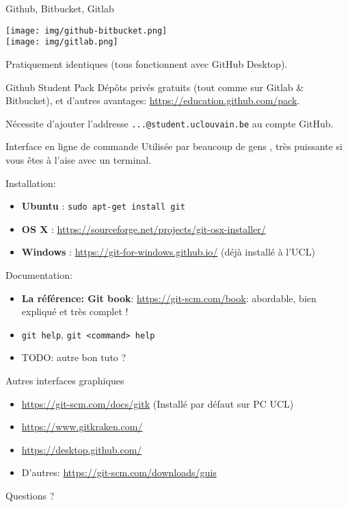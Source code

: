 \documentclass{beamer}
\begin{document}
\begin{frame}{Github, Bitbucket, Gitlab}
    \begin{center}
        \texttt{[image: img/github-bitbucket.png]} \\
        \texttt{[image: img/gitlab.png]}
    \end{center}
    Pratiquement identiques (tous fonctionnent avec GitHub Desktop).
\end{frame}

\begin{frame}{Github Student Pack}
    Dépôts privés gratuits (tout comme sur Gitlab \& Bitbucket), et d'autres avantages: \url{https://education.github.com/pack}.

    Nécessite d'ajouter l'addresse \texttt{...@student.uclouvain.be} au compte
    GitHub.
\end{frame}

\begin{frame}{Interface en ligne de commande}
    Utilisée par beaucoup de gens , très puissante si vous êtes à l'aise avec
    un terminal.

    Installation:
    \begin{itemize}
        \item \textbf{Ubuntu} : \texttt{sudo apt-get install git}
        \item \textbf{OS X} : \url{https://sourceforge.net/projects/git-osx-installer/}
        \item \textbf{Windows} : \url{https://git-for-windows.github.io/} (déjà
            installé à l'UCL)
    \end{itemize}

    Documentation:
    \begin{itemize}
        \item \textbf{La référence: Git book}: \url{https://git-scm.com/book}:
            abordable, bien expliqué et très complet !
        \item \texttt{git help}, \texttt{git <command> help}
        \item TODO: autre bon tuto ?
    \end{itemize}
\end{frame}

\begin{frame}{Autres interfaces graphiques}
    \begin{itemize}
        \item \url{https://git-scm.com/docs/gitk} (Installé par défaut sur PC UCL)
        \item \url{https://www.gitkraken.com/}
        \item \url{https://desktop.github.com/}
        \item D'autres: \url{https://git-scm.com/downloads/guis}
    \end{itemize}
\end{frame}

\begin{frame}[standout]
    Questions ?
\end{frame}
\end{document}
